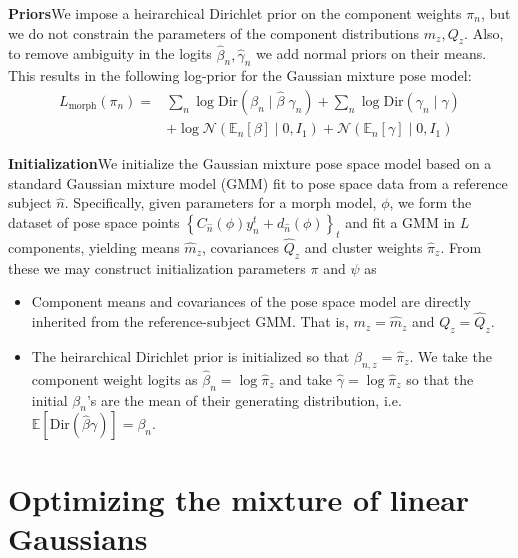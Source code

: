 \documentclass{article}         %
\newcommand{\EE}{\mathbb{E}}
\newcommand{\NN}{\mathcal{N}}
\newcommand{\cb}[1]{\left\{ #1 \right\}}
\newcommand{\pn}[1]{\left( #1 \right)}
\begin{document}
\textbf{Priors}\quad We impose a heirarchical Dirichlet prior on the component weights $\pi_n$, but we do not constrain the parameters of the component distributions $m_z, Q_z$. Also, to remove ambiguity in the logits $\hat\beta_n, \hat\gamma_n$ we add normal priors on their means. This results in the following log-prior for the Gaussian mixture pose model:
\begin{align}
    L_{\text{morph}}(\pi_n) =& \sum_n \log\text{Dir}(\beta_n \mid \hat\beta\;\gamma_n) + \sum_n \log\text{Dir}(\gamma_n\mid \hat\gamma) \\
    &+ \log \NN\pn{\EE_n[\beta]\mid 0, I_1} + \NN\pn{\EE_n[\gamma]\mid 0, I_1}
\end{align}

\textbf{Initialization}\quad We initialize the Gaussian mixture pose space model based on a standard Gaussian mixture model (GMM) fit to pose space data from a reference subject $\hat{n}$. Specifically, given parameters for a morph model, $\phi$, we form the dataset of pose space points $\cb{C_{\hat{n}}(\phi) y^t_n + d_{\hat{n}}(\phi)}_t$ and fit a GMM in $L$ components, yielding means $\hat{m}_z$, covariances $\hat{Q}_z$ and cluster weights $\hat\pi_z$. From these we may construct initialization parameters $\pi$ and $\psi$ as
\begin{itemize}
    \item Component means and covariances of the pose space model are directly inherited from the reference-subject GMM. That is, $m_z = \hat{m}_z$ and $Q_z = \hat{Q}_z$.
    \item The heirarchical Dirichlet prior is initialized so that $\beta_{n, z} = \hat{\pi}_z$. We take the component weight logits as $\hat\beta_n = \log \hat\pi_z$ and take $\hat\gamma = \log \hat\pi_z$ so that the initial $\beta_n$'s are the mean of their generating distribution, i.e. $\EE[\text{Dir}(\hat\beta \gamma)] = \beta_n$.
\end{itemize}


\label{full-model-derivation}
\section{Optimizing the mixture of linear Gaussians}
\end{document}
